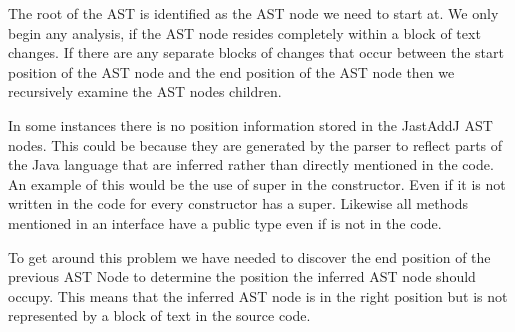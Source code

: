 The root of the AST is identified as the AST node we need to start at. 
We only begin any analysis, if the AST node resides completely within a block of text changes.
If there are any separate blocks of changes that occur between the start position of the AST node and the end position of the AST node then we recursively examine the AST nodes children.

% 
% 



In some instances there is no position information stored in the JastAddJ AST nodes.  This could be because they are generated by the parser to reflect parts of the Java language that are inferred rather than directly mentioned in the code.  An example of this would be the use of super in the constructor.  Even if it is not written in the code for every constructor has a super. Likewise all methods mentioned in an interface have a public type even if is not in the code.

To get around this problem we have needed to discover the end position of the previous AST Node to determine the position the inferred AST node should occupy.  This means that the inferred AST node is in the right position but is not represented by a block of text in the source code. 

% 
% 
% 

